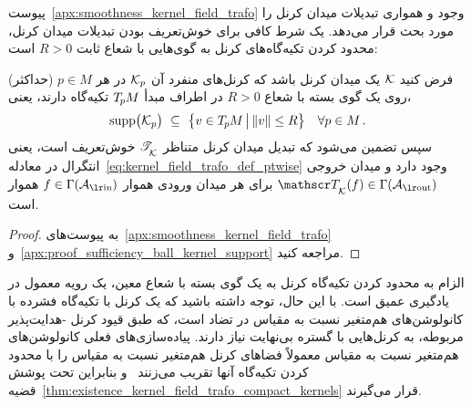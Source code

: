 پیوست~\ref{apx:smoothness_kernel_field_trafo} وجود و همواری تبدیلات میدان کرنل را مورد بحث قرار می‌دهد.
یک شرط کافی برای خوش‌تعریف بودن تبدیلات میدان کرنل، محدود کردن تکیه‌گاه‌های کرنل به گوی‌هایی با شعاع ثابت $R>0$ است:
\begin{thm}
\label{thm:existence_kernel_field_trafo_compact_kernels}
    فرض کنید $\mathcal{K}$ یک میدان کرنل باشد که کرنل‌های منفرد آن $\mathcal{K}_p$ در هر $p\in M$ (حداکثر) روی یک گوی بسته با شعاع $R>0$ در اطراف مبدأ $T_{\mkern-1.5mu p}\mkern-.5muM$ تکیه‌گاه دارند، یعنی،
    \begin{align}
        \operatorname{supp}\!\big(\mathcal{K}_p\big)\ \subseteq\ \big\{ v\in T_{\mkern-1.5mu p}\mkern-.5muM \,\big|\, \lVert v\rVert \leq R \big\} \quad \forall p\in M \,.
    \end{align}
    سپس تضمین می‌شود که تبدیل میدان کرنل متناظر $\mathscr{T}_{\overset{}{\mkern-0mu \mathcal{K}}}$ خوش‌تعریف است، یعنی انتگرال در معادله~\eqref{eq:kernel_field_trafo_def_ptwise} وجود دارد و میدان خروجی $\TK(f) \in \Gamma(\Aout)$ برای هر میدان ورودی هموار $f\in\Gamma(\Ain)$ هموار است.
\end{thm}
\begin{proof}
    به پیوست‌های~\ref{apx:smoothness_kernel_field_trafo} و~\ref{apx:proof_sufficiency_ball_kernel_support} مراجعه کنید.
\end{proof}
الزام به محدود کردن تکیه‌گاه کرنل به یک گوی بسته با شعاع معین، یک رویه معمول در یادگیری عمیق است.
با این حال، توجه داشته باشید که یک کرنل با تکیه‌گاه فشرده با کانولوشن‌های هم‌متغیر نسبت به مقیاس در تضاد است، که طبق قیود کرنل -هدایت‌پذیر مربوطه، به کرنل‌هایی با گستره بی‌نهایت نیاز دارند.
پیاده‌سازی‌های فعلی کانولوشن‌های هم‌متغیر نسبت به مقیاس معمولاً فضاهای کرنل هم‌متغیر نسبت به مقیاس را با محدود کردن تکیه‌گاه آنها تقریب می‌زنند~\cite{marcos2018scale,Worrall2019DeepScaleSpaces,ghosh2019scale,zhu2019scale,bekkers2020bspline,Sosnovik2020scale,naderi2020scalesteerable} و بنابراین تحت پوشش قضیه~\ref{thm:existence_kernel_field_trafo_compact_kernels} قرار می‌گیرند.


